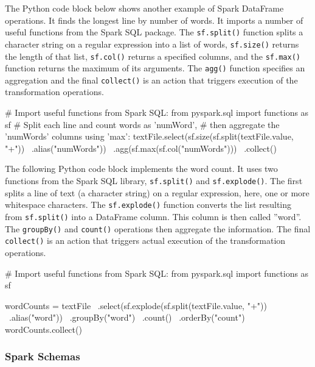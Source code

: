The Python code block below shows another example of Spark DataFrame operations. It finds the longest line by number of words. It imports a number of useful functions from the Spark SQL package. The \texttt{sf.split()} function splits a character string on a regular expression into a list of words, \texttt{sf.size()} returns the length of that list, \texttt{sf.col()} returns a specified columns, and the \texttt{sf.max()} function returns the maximum of its arguments. The \texttt{agg()} function specifies an aggregation and the final \texttt{collect()} is an action that triggers execution of the transformation operations.

\begin{samepage}
\begin{pythoncode}
# Import useful functions from Spark SQL:
from pyspark.sql import functions as sf
# Split each line and count words as 'numWord', 
# then aggregate the 'numWords' columns using 'max':
textFile.select(sf.size(sf.split(textFile.value, "\s+")) \
    .alias("numWords")) \
    .agg(sf.max(sf.col("numWords"))) \
    .collect()
\end{pythoncode}
\end{samepage}

The following Python code block implements the word count. It uses two functions from the Spark SQL library, \texttt{sf.split()} and \texttt{sf.explode()}. The first splits a line of text (a character string) on a regular expression, here, one or more whitespace characters. The \texttt{sf.explode()} function converts the list resulting from \texttt{sf.split()} into a DataFrame column. This column is then called ''word''. The \texttt{groupBy()} and \texttt{count()} operations then aggregate the information. The final \texttt{collect()} is an action that triggers actual execution of the transformation operations.

\begin{samepage}
\begin{pythoncode}
# Import useful functions from Spark SQL:
from pyspark.sql import functions as sf

wordCounts = textFile \
    .select(sf.explode(sf.split(textFile.value, "\s+")) \
    .alias("word")) \
    .groupBy("word") \
    .count() \
    .orderBy("count")
wordCounts.collect()
\end{pythoncode}
\end{samepage}

\subsubsection*{Spark Schemas}

